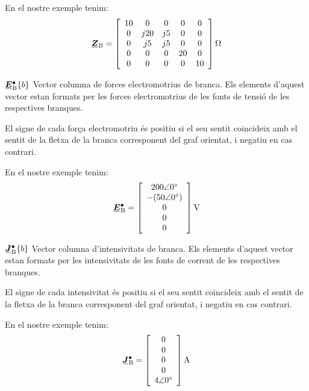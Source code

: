 \begin{list}{}
   En el nostre exemple tenim:
   \[
      \mcmplx{Z}\ped{B} = 
      \begin{bmatrix}\begin{array}{ccccc} 
            10 & 0 & 0 & 0 & 0 \\
            0 & j 20 & j 5 & 0 & 0 \\
            0 & j 5 & j 5 & 0 & 0 \\
            0 & 0 & 0 & 20 & 0 \\
            0 & 0 & 0 & 0 & 10
      \end{array}\end{bmatrix}\unit{\ohm}
   \]

   \item[$\mcmplx{E}\ped{B}^\bullet\{b\}$]  Vector columna de forces electromotrius de branca. Els elements d'aquest vector estan formats per les forces electromotrius de les fonts de tensió de les respectives branques.

El signe de cada força electromotriu és positiu si el seu sentit coincideix amb el sentit de la fletxa de la branca corresponent del graf orientat, i negatiu en cas contrari.

   En el nostre exemple tenim:
   \[
      \mcmplx{E}\ped{B}^\bullet = 
      \begin{bmatrix}\begin{array}{c}  
      	\complexnum{200:0} \\ -(\complexnum{50:0}) \\ 0 \\ 0 \\ 0 
      \end{array}\end{bmatrix}\unit{V}
   \]

\item[$\mcmplx{J}\ped{B}^\bullet\{b\}$] Vector columna d'intensivitats de branca. Els elements d'aquest vector estan formats per les intensivitats de les fonts de corrent de les respectives branques.

El signe de cada intensivitat és positiu si el seu sentit coincideix amb el sentit de la fletxa de la branca corresponent del graf orientat, i negatiu en cas contrari.

   En el nostre exemple tenim:
   \[
      \mcmplx{J}\ped{B}^\bullet = 
      \begin{bmatrix}\begin{array}{c}  
      	0 \\ 0 \\ 0 \\ 0 \\ \complexnum{4:0} 
      \end{array}\end{bmatrix}\unit{A}
   \]

\end{list}

